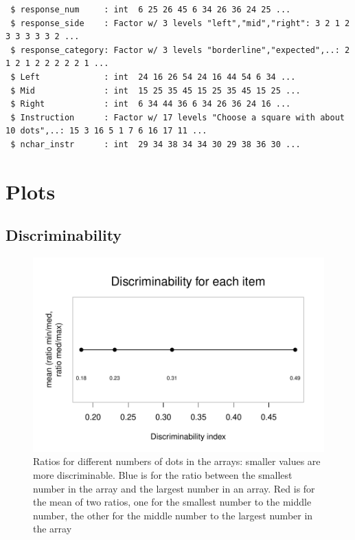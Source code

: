\documentclass[a4paper,12pt,twoside]{article}\usepackage[]{graphicx}\usepackage[]{color}
\makeatletter
\def\maxwidth{ %
  \ifdim\Gin@nat@width>\linewidth
    \linewidth
  \else
    \Gin@nat@width
  \fi
}
\newenvironment{kframe}{%
 \def\at@end@of@kframe{}%
 \ifinner\ifhmode%
  \def\at@end@of@kframe{\end{minipage}}%
  \begin{minipage}{\columnwidth}%
 \fi\fi%
 \def\FrameCommand##1{\hskip\@totalleftmargin \hskip-\fboxsep
 \colorbox{shadecolor}{##1}\hskip-\fboxsep
     \hskip-\linewidth \hskip-\@totalleftmargin \hskip\columnwidth}%
 \MakeFramed {\advance\hsize-\width
   \@totalleftmargin\z@ \linewidth\hsize
   \@setminipage}}%
 {\par\unskip\endMakeFramed%
 \at@end@of@kframe}
\newenvironment{knitrout}{}{} %
\makeatother
\begin{document}
\begin{knitrout}
\begin{kframe}
\begin{verbatim}
 $ response_num     : int  6 25 26 45 6 34 26 36 24 25 ...
 $ response_side    : Factor w/ 3 levels "left","mid","right": 3 2 1 2 3 3 3 3 3 2 ...
 $ response_category: Factor w/ 3 levels "borderline","expected",..: 2 1 2 1 2 2 2 2 2 1 ...
 $ Left             : int  24 16 26 54 24 16 44 54 6 34 ...
 $ Mid              : int  15 25 35 45 15 25 35 45 15 25 ...
 $ Right            : int  6 34 44 36 6 34 26 36 24 16 ...
 $ Instruction      : Factor w/ 17 levels "Choose a square with about 10 dots",..: 15 3 16 5 1 7 6 16 17 11 ...
 $ nchar_instr      : int  29 34 38 34 34 30 29 38 36 30 ...
\end{verbatim}
\end{kframe}
\end{knitrout}

\clearpage
\section{Plots}
\clearpage
\subsection{Discriminability}

\begin{knitrout}\scriptsize
{}\color{fgcolor}\begin{figure}[hbtp]

{\centering \includegraphics[width=\maxwidth]{figure/graphics-showCompression-1} 

}

\caption[Ratios for different numbers of dots in the arrays]{Ratios for different numbers of dots in the arrays: smaller values are more discriminable. Blue is for the ratio between the smallest number in the array and the largest number in an array. Red is for the mean of two ratios, one for the smallest number to the middle number, the other for the middle number to the largest number in the array}\label{fig:showCompression}
\end{figure}


\end{knitrout}
\end{document}
